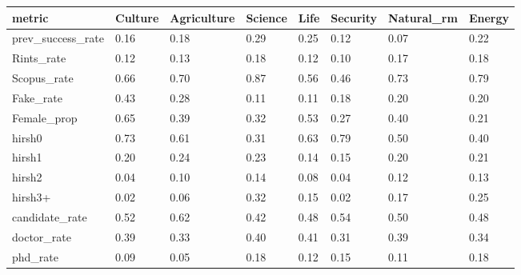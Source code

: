 \begin{table}
\centering
\begin{tabular}[t]{llllllll}
\toprule
metric & Culture & Agriculture & Science & Life & Security & Natural_rm & Energy\\
\midrule
prev_success_rate & 0.16 & 0.18 & 0.29 & 0.25 & 0.12 & 0.07 & 0.22\\
Rints_rate & 0.12 & 0.13 & 0.18 & 0.12 & 0.10 & 0.17 & 0.18\\
Scopus_rate & 0.66 & 0.70 & 0.87 & 0.56 & 0.46 & 0.73 & 0.79\\
Fake_rate & 0.43 & 0.28 & 0.11 & 0.11 & 0.18 & 0.20 & 0.20\\
Female_prop & 0.65 & 0.39 & 0.32 & 0.53 & 0.27 & 0.40 & 0.21\\
hirsh0 & 0.73 & 0.61 & 0.31 & 0.63 & 0.79 & 0.50 & 0.40\\
hirsh1 & 0.20 & 0.24 & 0.23 & 0.14 & 0.15 & 0.20 & 0.21\\
hirsh2 & 0.04 & 0.10 & 0.14 & 0.08 & 0.04 & 0.12 & 0.13\\
hirsh3+ & 0.02 & 0.06 & 0.32 & 0.15 & 0.02 & 0.17 & 0.25\\
candidate_rate & 0.52 & 0.62 & 0.42 & 0.48 & 0.54 & 0.50 & 0.48\\
doctor_rate & 0.39 & 0.33 & 0.40 & 0.41 & 0.31 & 0.39 & 0.34\\
phd_rate & 0.09 & 0.05 & 0.18 & 0.12 & 0.15 & 0.11 & 0.18\\
\bottomrule
\end{tabular}
\end{table}

